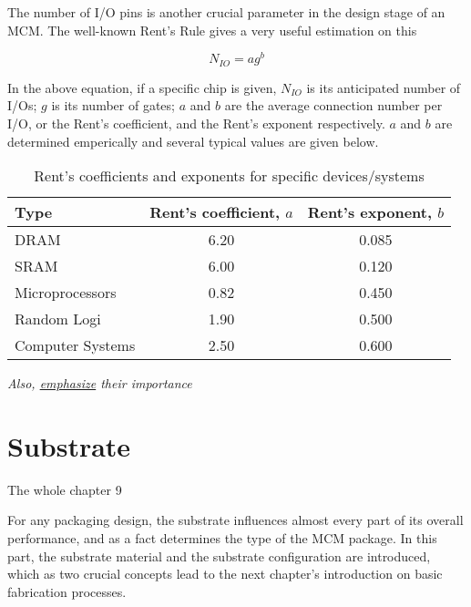 \begin{spacing}{1.5}
The number of I/O pins is another crucial parameter in the design stage of an MCM. The well-known Rent's Rule gives a very useful estimation on this 

\begin{equation}
    \label{eq.rent}
    N_{IO}=ag^b
\end{equation}

In the above equation, if a specific chip is given, $N_{IO}$ is its anticipated number of I/Os; $g$ is its number of gates; $a$ and $b$ are the average connection number per I/O, or the Rent's coefficient, and the Rent's exponent respectively. \cite{landman1971pin} $a$ and $b$ are determined emperically and several typical values are given below. \cite{tummala2001fundamentals}

\begin{table}[ht]
    \centering 
    \caption{Rent's coefficients and exponents for specific devices/systems} 
    \label{tb.rent} 
    \begin{tabular}[t]{lcc}
        \toprule 
        Type & Rent's coefficient, $a$ & Rent's exponent, $b$ \\ 
        \midrule 
        DRAM & 6.20 & 0.085 \\
        SRAM & 6.00 & 0.120 \\ 
        Microprocessors & 0.82 & 0.450 \\ 
        Random Logi & 1.90 & 0.500 \\
        Computer Systems & 2.50 & 0.600 \\ 
        \bottomrule
    \end{tabular}
\end{table}

\textit{Also, \underline{emphasize} their importance}

\section{Substrate}

The whole chapter 9 \cite{chen2006vlsi}

For any packaging design, the substrate influences almost every part of its overall performance, and as a fact determines the type of the MCM package. In this part, the substrate material and the substrate configuration are introduced, which as two crucial concepts lead to the next chapter's introduction on basic fabrication processes. 



\end{spacing}
